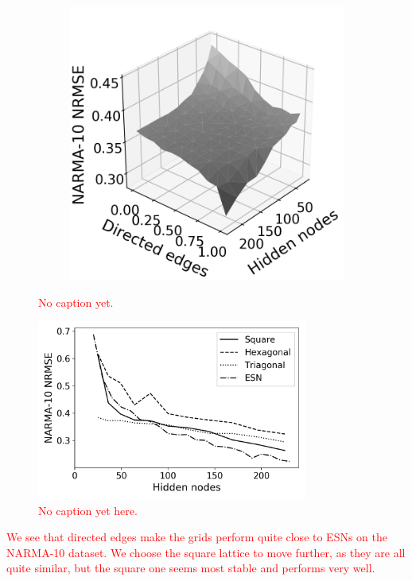 \begin{figure}[t]
\begin{subfigure}{.32\textwidth}
    \caption{}
    \label{fig:rt-dir-perf-trisurf-hex}
  \end{subfigure}
  \begin{subfigure}{.32\textwidth}
    \centering
    \includegraphics[width=1.0\linewidth]{figures/rt-dir-perf-tri.png}
    \caption{}
    \label{fig:rt-dir-perf-trisurf-tri}
  \end{subfigure}
  \caption{
    \textcolor{red}{No caption yet.}
  }
  \label{fig:rt-dir-perf-trisurf}

  \centering
  \includegraphics[width=3.5in]{figures/rt-dir-perf.png}
  \caption{\textcolor{red}{No caption yet here.}}
  \label{fig:rt-dir-perf}
\end{figure}

\textcolor{red}{
  We see that directed edges make the grids perform quite close to ESNs on the
NARMA-10 dataset. We choose the square lattice to move further, as they are all
quite similar, but the square one seems most stable and performs very well.
}

